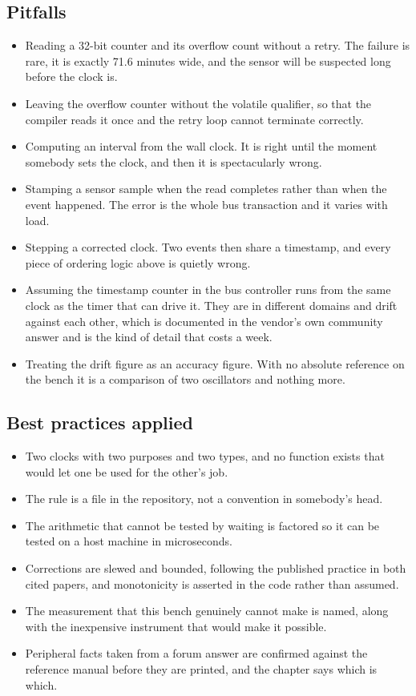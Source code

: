 \subsection*{Pitfalls}

\begin{itemize}
\item Reading a 32-bit counter and its overflow count without a retry. The
failure is rare, it is exactly 71.6 minutes wide, and the sensor will be
suspected long before the clock is.
\item Leaving the overflow counter without the volatile qualifier, so that the
compiler reads it once and the retry loop cannot terminate correctly.
\item Computing an interval from the wall clock. It is right until the moment
somebody sets the clock, and then it is spectacularly wrong.
\item Stamping a sensor sample when the read completes rather than when the
event happened. The error is the whole bus transaction and it varies with load.
\item Stepping a corrected clock. Two events then share a timestamp, and every
piece of ordering logic above is quietly wrong.
\item Assuming the timestamp counter in the bus controller runs from the same
clock as the timer that can drive it. They are in different domains and drift
against each other, which is documented in the vendor's own community answer and
is the kind of detail that costs a week.
\item Treating the drift figure as an accuracy figure. With no absolute
reference on the bench it is a comparison of two oscillators and nothing more.
\end{itemize}

\subsection*{Best practices applied}

\begin{itemize}
\item Two clocks with two purposes and two types, and no function exists that
would let one be used for the other's job.
\item The rule is a file in the repository, not a convention in somebody's head.
\item The arithmetic that cannot be tested by waiting is factored so it can be
tested on a host machine in microseconds.
\item Corrections are slewed and bounded, following the published practice in
both cited papers, and monotonicity is asserted in the code rather than assumed.
\item The measurement that this bench genuinely cannot make is named, along with
the inexpensive instrument that would make it possible.
\item Peripheral facts taken from a forum answer are confirmed against the
reference manual before they are printed, and the chapter says which is which.
\end{itemize}

